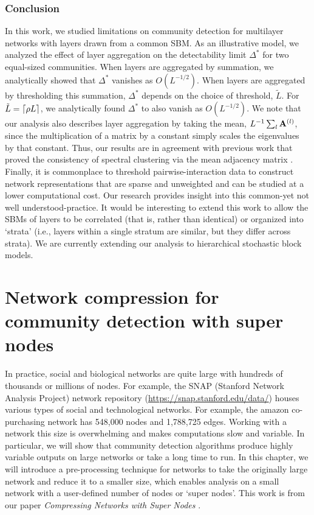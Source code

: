 \subsection{Conclusion}

In this work, we studied limitations on community detection for multilayer networks with layers drawn from a common SBM. As an illustrative model, we analyzed the effect of layer aggregation on the detectability limit $\Delta^{*}$ for two equal-sized communities. When layers are aggregated by summation, we analytically showed that $\Delta^{*}$ vanishes as $O(L^{-1/2})$. When layers are aggregated by thresholding this summation, $\Delta^{*}$ depends on the choice of threshold, $\tilde{L}$. For $\tilde{L}=\ceil*{\rho L}$, we analytically found $\Delta^{*}$ to also vanish as $O(L^{-1/2})$. We note that our analysis also describes layer aggregation by taking the mean, $L^{-1}\sum_{l}{\bf A}^{(l)}$, since the multiplication of a matrix by a constant simply scales the eigenvalues by that constant. Thus, our results are in agreement with previous work that proved the consistency of spectral clustering via the mean adjacency matrix \cite{airoldi}. \\
\indent Finally, it is commonplace to threshold pairwise-interaction data to construct network representations that are sparse and unweighted and can be studied at a lower computational cost. Our research provides insight into this common-yet not well understood-practice. It would be interesting to extend this work to allow the SBMs of layers to be correlated \cite{detect25} (that is, rather than identical) or organized into `strata' \cite{smlsbm} (i.e., layers within a single stratum are similar, but they differ across strata). We are currently extending our analysis to hierarchical stochastic block models. 

\chapter{Network compression for community detection with super nodes}

\noindent{}


\indent In practice, social and biological networks are quite large with hundreds of thousands or millions of nodes. For example, the SNAP (Stanford Network Analysis Project) network repository (\url{https://snap.stanford.edu/data/}) houses various types of social and technological networks. For example, the amazon co-purchasing network has 548,000 nodes and 1,788,725 edges. Working with a network this size is overwhelming and makes computations slow and variable. In particular, we will show that community detection algorithms produce highly variable outputs on large networks or take a long time to run. In this chapter, we will introduce a pre-processing technique for networks to take the originally large network and reduce it to a smaller size, which enables analysis on a small network with a user-defined number of nodes or `super nodes'. This work is from our paper \emph{Compressing Networks with Super Nodes} \cite{compressing}.

